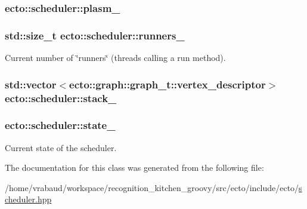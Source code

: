 \hypertarget{classecto_1_1scheduler_a9ccfb508a5bf75ec7ca69b475a7c7226}{
\subsubsection[{plasm\-\_\-}]{ {\bf ecto\-::scheduler\-::plasm\-\_\-}}}\label{classecto_1_1scheduler_a9ccfb508a5bf75ec7ca69b475a7c7226}
\hypertarget{classecto_1_1scheduler_a650d97445fe90ba4572d208430f71e20}{
\subsubsection[{runners\-\_\-}]{\setlength{\rightskip}{0pt plus 5cm}std\-::size\-\_\-t {\bf ecto\-::scheduler\-::runners\-\_\-}}}\label{classecto_1_1scheduler_a650d97445fe90ba4572d208430f71e20}


\-Current number of \char`\"{}runners\char`\"{} (threads calling a run method). 

\hypertarget{classecto_1_1scheduler_ad2b6561ebc08afd8cf8edaa39cb702b8}{
\subsubsection[{stack\-\_\-}]{\setlength{\rightskip}{0pt plus 5cm}std\-::vector$<$ecto\-::graph\-::graph\-\_\-t\-::vertex\-\_\-descriptor$>$ {\bf ecto\-::scheduler\-::stack\-\_\-}}}\label{classecto_1_1scheduler_ad2b6561ebc08afd8cf8edaa39cb702b8}
\hypertarget{classecto_1_1scheduler_a21d2aac4a8a2ef665942b7c9b741250c}{
\subsubsection[{state\-\_\-}]{ {\bf ecto\-::scheduler\-::state\-\_\-}}}\label{classecto_1_1scheduler_a21d2aac4a8a2ef665942b7c9b741250c}


\-Current state of the scheduler. 



\-The documentation for this class was generated from the following file\-:\begin{DoxyCompactItemize}
\item 
/home/vrabaud/workspace/recognition\-\_\-kitchen\-\_\-groovy/src/ecto/include/ecto/\hyperlink{scheduler_8hpp}{scheduler.\-hpp}\end{DoxyCompactItemize}
